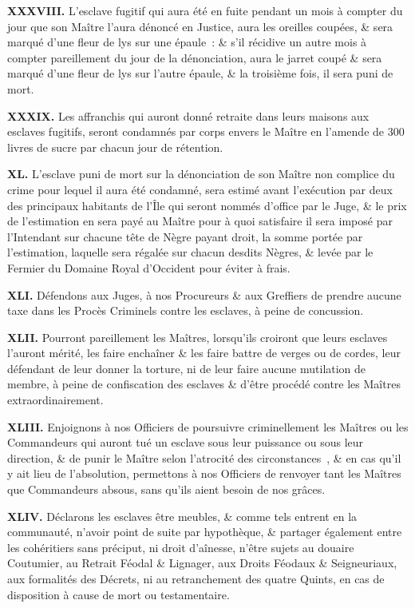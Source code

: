 \documentclass[french,twoside]{book} %
\newcommand{\labelchar}[1]{\textbf{\color{rubric} #1}}
\begin{document}
\labelchar{XXXVIII.} L’esclave fugitif qui aura été en fuite pendant un mois à compter du jour que son Maître l’aura dénoncé en Justice, aura les oreilles coupées, \& sera marqué d’une fleur de lys sur une épaule : \& s’il récidive un autre mois à compter pareillement du jour de la dénonciation, aura le jarret coupé \& sera marqué d’une fleur de lys sur l’autre épaule, \& la troisième fois, il sera puni de mort.\par
\labelchar{XXXIX.} Les affranchis qui auront donné retraite dans leurs maisons aux esclaves fugitifs, seront condamnés par corps envers le Maître en l’amende de 300 livres de sucre par chacun jour de rétention.\par
\labelchar{XL.} L’esclave puni de mort sur la dénonciation de son Maître non complice du crime pour lequel il aura été condamné, sera estimé avant l’exécution par deux des principaux habitants de l’Île qui seront nommés d’office par le Juge, \& le prix de l’estimation en sera payé au Maître pour à quoi satisfaire il sera imposé par l’Intendant sur chacune tête de Nègre payant droit, la somme portée par l’estimation, laquelle sera régalée sur chacun desdits Nègres, \& levée par le Fermier du Domaine Royal d’Occident pour éviter à frais.\par
\labelchar{XLI.} Défendons aux Juges, à nos Procureurs \& aux Greffiers de prendre aucune taxe dans les Procès Criminels contre les esclaves, à peine de concussion.\par
\labelchar{XLII.} Pourront pareillement les Maîtres, lorsqu’ils croiront que leurs esclaves l’auront mérité, les faire enchaîner \& les faire battre de verges ou de cordes, leur défendant de leur donner la torture, ni de leur faire aucune mutilation de membre, à peine de confiscation des esclaves \& d’être procédé contre les Maîtres extraordinairement.\par
\labelchar{XLIII.} Enjoignons à nos Officiers de poursuivre criminellement les Maîtres ou les Commandeurs qui auront tué un esclave sous leur puissance ou sous leur direction, \& de punir le Maître selon l’atrocité des circonstances , \& en cas qu’il y ait lieu de l’absolution, permettons à nos Officiers de renvoyer tant les Maîtres que Commandeurs absous, sans qu’ils aient besoin de nos grâces.\par
\labelchar{XLIV.} Déclarons les esclaves être meubles, \& comme tels entrent en la communauté, n’avoir point de suite par hypothèque, \& partager également entre les cohéritiers sans préciput, ni droit d’aînesse, n’être sujets au douaire Coutumier, au Retrait Féodal \& Lignager, aux Droits Féodaux \& Seigneuriaux, aux formalités des Décrets, ni au retranchement des quatre Quints, en cas de disposition à cause de mort ou testamentaire.\par
\end{document}
